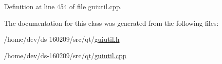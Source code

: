 Definition at line 454 of file guiutil.\+cpp.



The documentation for this class was generated from the following files\+:\begin{DoxyCompactItemize}
\item 
/home/dev/ds-\/160209/src/qt/\hyperlink{guiutil_8h}{guiutil.\+h}\item 
/home/dev/ds-\/160209/src/qt/\hyperlink{guiutil_8cpp}{guiutil.\+cpp}\end{DoxyCompactItemize}
